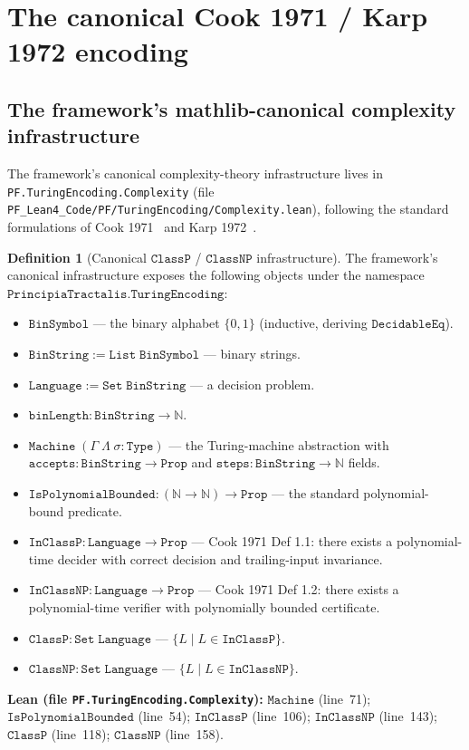 \documentclass[11pt,a4paper]{article}
\theoremstyle{plain}
\theoremstyle{definition}
\newtheorem{definition}[theorem]{Definition}
\begin{document}
\section{The canonical Cook 1971 / Karp 1972 encoding}
\label{sec:canonical-encoding}

\subsection{The framework's mathlib-canonical complexity infrastructure}
\label{sec:framework-canonical}

The framework's canonical complexity-theory infrastructure lives in
\texttt{PF.TuringEncoding.Complexity} (file
\texttt{PF\_Lean4\_Code/PF/TuringEncoding/Complexity.lean}), following
the standard formulations of Cook 1971~\cite{cook1971} and Karp
1972~\cite{karp1972}.

\begin{definition}[Canonical $\mathtt{ClassP}$ / $\mathtt{ClassNP}$
infrastructure]
\label{def:canonical-classes}
The framework's canonical infrastructure exposes the following objects
under the namespace
$\mathtt{PrincipiaTractalis.TuringEncoding}$:
\begin{itemize}[leftmargin=*,nosep]
\item $\mathtt{BinSymbol}$ --- the binary alphabet $\{0, 1\}$
  (inductive, deriving $\mathtt{DecidableEq}$).
\item $\mathtt{BinString} := \mathtt{List\;BinSymbol}$ --- binary
  strings.
\item $\mathtt{Language} := \mathtt{Set\;BinString}$ --- a decision
  problem.
\item $\mathtt{binLength : BinString \to \mathbb{N}}$.
\item $\mathtt{Machine\;(\Gamma\;\Lambda\;\sigma : Type)}$ --- the
  Turing-machine abstraction with $\mathtt{accepts : BinString \to
  Prop}$ and $\mathtt{steps : BinString \to \mathbb{N}}$ fields.
\item $\mathtt{IsPolynomialBounded : (\mathbb{N} \to \mathbb{N}) \to
  Prop}$ --- the standard polynomial-bound predicate.
\item $\mathtt{InClassP : Language \to Prop}$ --- Cook 1971 Def 1.1:
  there exists a polynomial-time decider with correct decision and
  trailing-input invariance.
\item $\mathtt{InClassNP : Language \to Prop}$ --- Cook 1971 Def 1.2:
  there exists a polynomial-time verifier with polynomially bounded
  certificate.
\item $\mathtt{ClassP : Set\;Language}$ --- $\{L \mid L \in
  \mathtt{InClassP}\}$.
\item $\mathtt{ClassNP : Set\;Language}$ --- $\{L \mid L \in
  \mathtt{InClassNP}\}$.
\end{itemize}
\textbf{Lean (file
\texttt{PF.TuringEncoding.Complexity}):}
$\mathtt{Machine}$ (line~71);
$\mathtt{IsPolynomialBounded}$ (line~54);
$\mathtt{InClassP}$ (line~106);
$\mathtt{InClassNP}$ (line~143);
$\mathtt{ClassP}$ (line~118);
$\mathtt{ClassNP}$ (line~158).
\end{definition}
\end{document}
